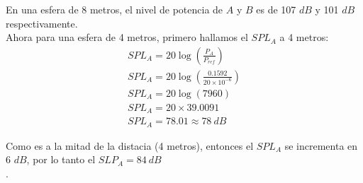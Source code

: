\documentclass{article}
\begin{document}
En una esfera de 8 metros, el nivel de potencia de $A$ y $B$ es de 107 $dB$ y 101 $dB$ respectivamente.\\

Ahora para una esfera de 4 metros, primero hallamos el $SPL_A$ a 4 metros:
\begin{gather*}
    SPL_A = 20 \log(\frac{P_A}{P_{ref}})\\
    SPL_A = 20 \log(\frac{0.1592}{20 \times 10^{-6}})\\
    SPL_A = 20 \log(7960)\\
    SPL_A = 20 \times 39.0091\\
    SPL_A = 78.01 \approx 78\ dB
\end{gather*}

Como es a la mitad de la distacia (4 metros), entonces el $SPL_A$ se incrementa en 6 $dB$, por lo tanto el $SLP_A = 84\ dB$\\.
\end{document}
